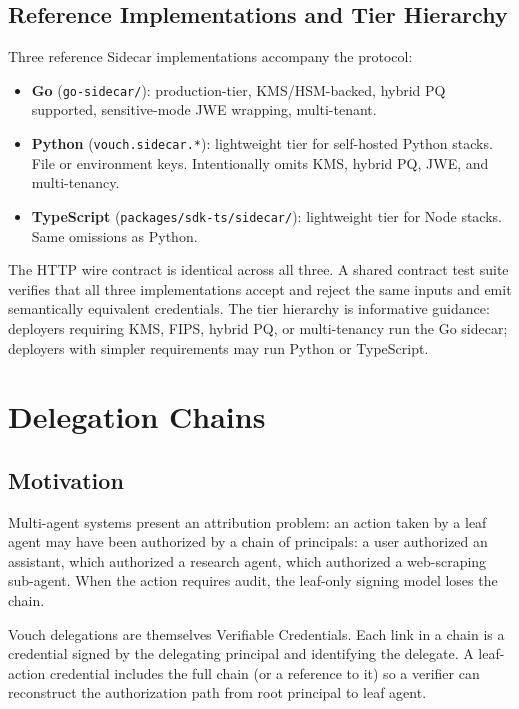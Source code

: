 \documentclass[11pt,a4paper,twocolumn]{article}
\begin{document}
\subsection{Reference Implementations and Tier Hierarchy}

Three reference Sidecar implementations accompany the protocol:

\begin{itemize}[leftmargin=*]
\item \textbf{Go} (\verb|go-sidecar/|): production-tier, KMS/HSM-backed, hybrid PQ supported, sensitive-mode JWE wrapping, multi-tenant.
\item \textbf{Python} (\verb|vouch.sidecar.*|): lightweight tier for self-hosted Python stacks. File or environment keys. Intentionally omits KMS, hybrid PQ, JWE, and multi-tenancy.
\item \textbf{TypeScript} (\verb|packages/sdk-ts/sidecar/|): lightweight tier for Node stacks. Same omissions as Python.
\end{itemize}

The HTTP wire contract is identical across all three. A shared contract test suite verifies that all three implementations accept and reject the same inputs and emit semantically equivalent credentials. The tier hierarchy is informative guidance: deployers requiring KMS, FIPS, hybrid PQ, or multi-tenancy run the Go sidecar; deployers with simpler requirements may run Python or TypeScript.

\section{Delegation Chains}
\label{sec:delegation}

\subsection{Motivation}

Multi-agent systems present an attribution problem: an action taken by a leaf agent may have been authorized by a chain of principals: a user authorized an assistant, which authorized a research agent, which authorized a web-scraping sub-agent. When the action requires audit, the leaf-only signing model loses the chain.

Vouch delegations are themselves Verifiable Credentials. Each link in a chain is a credential signed by the delegating principal and identifying the delegate. A leaf-action credential includes the full chain (or a reference to it) so a verifier can reconstruct the authorization path from root principal to leaf agent.
\end{document}
